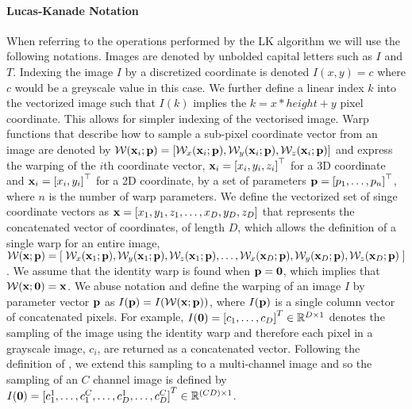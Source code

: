 \paragraph{Lucas-Kanade Notation}\label{subsubsec:lk-notation}
When referring to the operations performed by the LK algorithm we will use the
following notations. Images are denoted by unbolded capital letters such as
$I$ and $T$. Indexing the image $I$ by a discretized coordinate is
denoted $I(x, y) = c$ where $c$ would be a greyscale value in this case. We
further define a linear index $k$ into the vectorized image such that $I(k)$ 
implies the $k = x * height + y$ pixel coordinate. 
This allows for simpler indexing of the vectorised image.
Warp functions that describe how to sample a sub-pixel coordinate
vector from an image are denoted by
$\mathcal{W}(\boldsymbol{\mathbf{x}}_i;\boldsymbol{\mathbf{p}}) = \left[\mathcal{W}_x(\boldsymbol{\mathbf{x}}_i;\boldsymbol{\mathbf{p}}), \mathcal{W}_y(\boldsymbol{\mathbf{x}}_i;\boldsymbol{\mathbf{p}}),\mathcal{W}_z(\boldsymbol{\mathbf{x}}_i;\boldsymbol{\mathbf{p}}) \right]$ 
and express the warping of the $i$th coordinate vector,
$\boldsymbol{\mathbf{x}}_i = {[x_i, y_i, z_i]}^{\top}$ for a 3D coordinate and 
$\boldsymbol{\mathbf{x}}_i = {[x_i, y_i]}^{\top}$ for a 2D coordinate, by a set of parameters
$\boldsymbol{\mathbf{p}} = {\left[p_1, \ldots, p_n\right]}^{\top}$, where $n$ is the number of warp
parameters. We define the vectorized set of singe coordinate vectors as
$\boldsymbol{\mathbf{x}} = \left[ x_1, y_1, z_1, \ldots, x_D, y_D, z_D \right]$ that
represents the concatenated vector of coordinates, of length $D$, which allows
the definition of a single warp for an entire image,
$\mathcal{W}(\boldsymbol{\mathbf{x}};\boldsymbol{\mathbf{p}}) = \left[\right. \mathcal{W}_x(\boldsymbol{\mathbf{x}}_1;\boldsymbol{\mathbf{p}}), \mathcal{W}_y(\boldsymbol{\mathbf{x}}_1;\boldsymbol{\mathbf{p}}), \mathcal{W}_z(\boldsymbol{\mathbf{x}}_1;\boldsymbol{\mathbf{p}}),\ldots,\mathcal{W}_x(\boldsymbol{\mathbf{x}}_D;\boldsymbol{\mathbf{p}}), \mathcal{W}_y(\boldsymbol{\mathbf{x}}_D;\boldsymbol{\mathbf{p}}), \mathcal{W}_z(\boldsymbol{\mathbf{x}}_D;\boldsymbol{\mathbf{p}}) \left.\right]$.
We assume that the identity warp is found when $\boldsymbol{\mathbf{p}} = \boldsymbol{\mathbf{0}}$, which implies that
$\mathcal{W}(\boldsymbol{\mathbf{x}};\boldsymbol{\mathbf{0}}) = \boldsymbol{\mathbf{x}}$. We abuse notation and define the
warping of an image $I$ by parameter vector $\boldsymbol{\mathbf{p}}$ as $I(\boldsymbol{\mathbf{p}}) = I(\mathcal{W}(\boldsymbol{\mathbf{x}};\boldsymbol{\mathbf{p}}))$,
where $I(\boldsymbol{\mathbf{p}})$ is a single column vector of concatenated pixels. For example,
$I(\boldsymbol{\mathbf{0}}) = {[c_1, \ldots, c_D]}^T \in \mathbb{R}^{D \times 1}$ denotes the 
sampling of the image using the
identity warp and therefore each pixel in a grayscale image, $c_i$, are returned
as a concatenated vector. Following the definition of
\citet{antonakos2015feature}, we extend this sampling to a multi-channel image
and so the sampling of an $C$ channel image is defined by 
$I(\boldsymbol{\mathbf{0}}) = {[c^1_1, \ldots, c^C_1, \ldots, c^1_D, \ldots, c^C_D]}^T \in \mathbb{R}^{(CD) \times 1}$.
